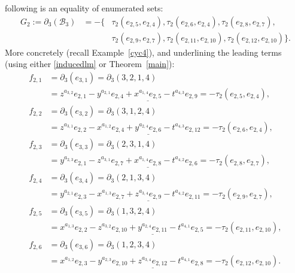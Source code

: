 \documentclass[ALCO]{cedram}
\newcommand{\mcb}{\mbox{$\mathcal{B}$}}
\newcommand{\dif}{\mbox{$\partial$}}
\begin{document}
following is an equality of enumerated sets:
\begin{eqnarray*}
G_2:=\dif_3(\mcb_3)& = - \{ & \tau_2(e_{2,5},e_{2,4}),\tau_2(e_{2,6},e_{2,4}),
\tau_2(e_{2,8},e_{2,7}),\\ &&
\tau_2(e_{2,9},e_{2,7}),\tau_2(e_{2,11},e_{2,10}),\tau_2(e_{2,12},e_{2,10})\}.
\end{eqnarray*}
More concretely (recall Example~\ref{cyc4}), and underlining the
leading terms (using either \eqref{inducedlm} or Theorem~\ref{main}):
\begin{align*}
f_{2,1}&= \dif_3(e_{3,1})=\dif_3(3,2,1,4)\\ &=
z^{a_{3,2}}e_{2,1}-y^{a_{2,1}}e_{2,4}+
\underline{x^{a_{1,4}}e_{2,5}}-t^{a_{4,3}}e_{2,9}=-\tau_2(e_{2,5},e_{2,4}),\\ 
f_{2,2}&= \dif_3(e_{3,2})=\dif_3(3,1,2,4)\\ &=
z^{a_{3,1}}e_{2,2}-x^{a_{1,2}}e_{2,4}+
\underline{y^{a_{2,4}}e_{2,6}}-t^{a_{4,3}}e_{2,12}
=-\tau_2(e_{2,6},e_{2,4}),\\ 
f_{2,3}&= \dif_3(e_{3,3})=\dif_3(2,3,1,4)\\ &=
y^{a_{2,3}}e_{2,1}-z^{a_{3,1}}e_{2,7}+
\underline{x^{a_{1,4}}e_{2,8}}-t^{a_{4,2}}e_{2,6}
=-\tau_2(e_{2,8},e_{2,7}),\\ 
f_{2,4}&= \dif_3(e_{3,4})=\dif_3(2,1,3,4)\\ &=
y^{a_{2,1}}e_{2,3}-x^{a_{1,3}}e_{2,7}
+\underline{z^{a_{3,4}}e_{2,9}}-t^{a_{4,2}}e_{2,11}
=-\tau_2(e_{2,9},e_{2,7}),\\
f_{2,5}&= \dif_3(e_{3,5})=\dif_3(1,3,2,4)\\ &=
x^{a_{1,3}}e_{2,2}-z^{a_{3,2}}e_{2,10}+
\underline{y^{a_{2,4}}e_{2,11}}-t^{a_{4,1}}e_{2,5}
=-\tau_2(e_{2,11},e_{2,10}),\\
f_{2,6}&= \dif_3(e_{3,6})=\dif_3(1,2,3,4)\\ &=
x^{a_{1,2}}e_{2,3}-y^{a_{2,3}}e_{2,10}+
\underline{z^{a_{3,4}}e_{2,12}}-t^{a_{4,1}}e_{2,8}
=-\tau_2(e_{2,12},e_{2,10}).
\end{align*}
\end{document}
